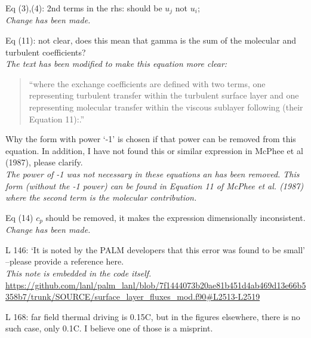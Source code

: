 \documentclass[tc, manuscript]{copernicus}
\begin{document}
Eq (3),(4): 2nd terms in the rhs: should be $u_j$ not $u_i$;\\
\textit{Change has been made.}\vspace{12pt}

Eq (11): not clear, does this mean that gamma is the sum of the molecular and turbulent coefficients? \\
\textit{The text has been modified to make this equation more clear:}
\begin{quote}
``where the exchange coefficients are defined with two terms, one representing turbulent transfer within the turbulent surface layer and one representing molecular transfer within the viscous sublayer following \citet{mcphee_dynamics_1987} (their Equation 11):.''
\end{quote}\vspace{12pt}

Why the form with power ‘-1’ is chosen if that power can be removed from this equation. In addition, I have not found this or similar expression in McPhee et al (1987), please clarify.\\
\textit{The power of -1 was not necessary in these equations an has been removed. This form (without the -1 power) can be found in Equation 11 of McPhee et al. (1987) where the second term is the molecular contribution.}\vspace{12pt}

Eq (14) $c_p$ should be removed, it makes the expression dimensionally inconsistent.\\
\textit{Change has been made.}\vspace{12pt}

L 146: ‘It is noted by the PALM developers that this error was found to be small’ –please provide a reference here.\\
\textit{This note is embedded in the code itself.}
\url{https://github.com/lanl/palm_lanl/blob/7f1444073b20ae81b451d4ab469d13e66b5358b7/trunk/SOURCE/surface_layer_fluxes_mod.f90#L2513-L2519}\vspace{12pt}

L 168: far field thermal driving is 0.15C, but in the figures elsewhere, there is no such case, only 0.1C. I believe one of those is a misprint.\vspace{12pt}
\end{document}
